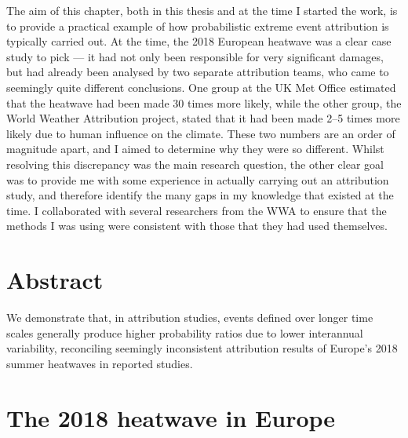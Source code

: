   The aim of this chapter, both in this thesis and at the time I started the work, is to provide a practical example of how probabilistic extreme event attribution is typically carried out. At the time, the 2018 European heatwave was a clear case study to pick --- it had not only been responsible for very significant damages, but had already been analysed by two separate attribution teams, who came to seemingly quite different conclusions. One group at the UK Met Office estimated that the heatwave had been made 30 times more likely, while the other group, the World Weather Attribution project, stated that it had been made 2--5 times more likely due to human influence on the climate. These two numbers are an order of magnitude apart, and I aimed to determine why they were so different.  Whilst resolving this discrepancy was the main research question, the other clear goal was to provide me with some experience in actually carrying out an attribution study, and therefore identify the many gaps in my knowledge that existed at the time. I collaborated with several researchers from the WWA to ensure that the methods I was using were consistent with those that they had used themselves. 

\section{Abstract}\label{ch2:abstract}

  We demonstrate that, in attribution studies, events defined over longer time scales generally produce higher probability ratios due to lower interannual variability, reconciling seemingly inconsistent attribution results of Europe's 2018 summer heatwaves in reported studies.

\section{The 2018 heatwave in Europe}\label{ch2:heatwave}

